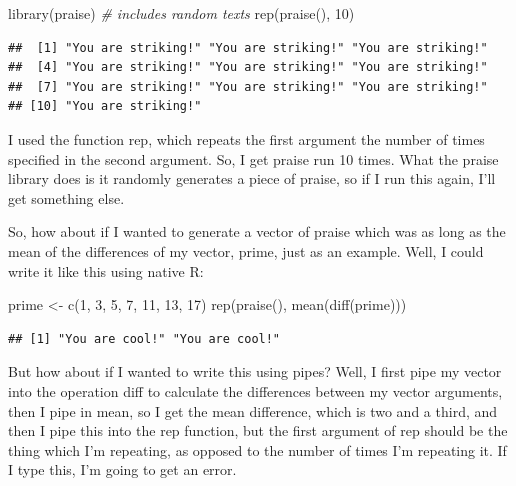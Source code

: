\documentclass[
]{article}
\newenvironment{Shaded}{\begin{snugshade}}{\end{snugshade}}
\newcommand{\CommentTok}[1]{\textcolor[rgb]{0.56,0.35,0.01}{\textit{#1}}}
\newcommand{\DecValTok}[1]{\textcolor[rgb]{0.00,0.00,0.81}{#1}}
\newcommand{\FunctionTok}[1]{\textcolor[rgb]{0.00,0.00,0.00}{#1}}
\newcommand{\NormalTok}[1]{#1}
\newcommand{\OtherTok}[1]{\textcolor[rgb]{0.56,0.35,0.01}{#1}}
\begin{document}
\begin{Shaded}
\begin{Highlighting}[]
\FunctionTok{library}\NormalTok{(praise) }\CommentTok{\# includes random texts}
\FunctionTok{rep}\NormalTok{(}\FunctionTok{praise}\NormalTok{(), }\DecValTok{10}\NormalTok{)}
\end{Highlighting}
\end{Shaded}

\begin{verbatim}
##  [1] "You are striking!" "You are striking!" "You are striking!"
##  [4] "You are striking!" "You are striking!" "You are striking!"
##  [7] "You are striking!" "You are striking!" "You are striking!"
## [10] "You are striking!"
\end{verbatim}

I used the function rep, which repeats the first argument the number of times specified in the second argument. So, I get praise run 10 times. What the praise library does is it randomly generates a piece of praise, so if I run this again, I'll get something else.

So, how about if I wanted to generate a vector of praise which was as long as the mean of the differences of my vector, prime, just as an example. Well, I could write it like this using native R:

\begin{Shaded}
\begin{Highlighting}[]
\NormalTok{prime }\OtherTok{\textless{}{-}} \FunctionTok{c}\NormalTok{(}\DecValTok{1}\NormalTok{, }\DecValTok{3}\NormalTok{, }\DecValTok{5}\NormalTok{, }\DecValTok{7}\NormalTok{, }\DecValTok{11}\NormalTok{, }\DecValTok{13}\NormalTok{, }\DecValTok{17}\NormalTok{)}
\FunctionTok{rep}\NormalTok{(}\FunctionTok{praise}\NormalTok{(), }\FunctionTok{mean}\NormalTok{(}\FunctionTok{diff}\NormalTok{(prime)))}
\end{Highlighting}
\end{Shaded}

\begin{verbatim}
## [1] "You are cool!" "You are cool!"
\end{verbatim}

But how about if I wanted to write this using pipes? Well, I first pipe my vector into the operation diff to calculate the differences between my vector arguments, then I pipe in mean, so I get the mean difference, which is two and a third, and then I pipe this into the rep function, but the first argument of rep should be the thing which I'm repeating, as opposed to the number of times I'm repeating it. If I type this, I'm going to get an error.
\end{document}
